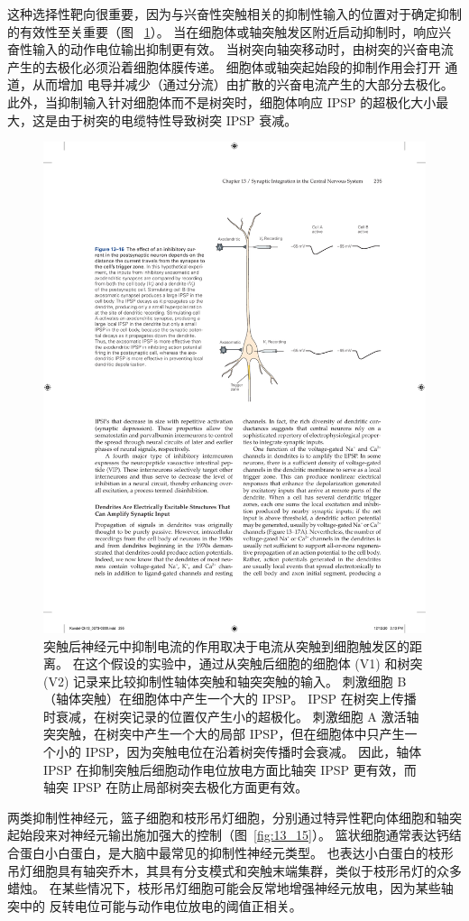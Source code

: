 这种选择性靶向很重要，因为与兴奋性突触相关的抑制性输入的位置对于确定抑制的有效性至关重要（图 ~\ref{fig:13_16}）。
当在细胞体或轴突触发区附近启动抑制时，响应兴奋性输入的动作电位输出抑制更有效。
当树突向轴突移动时，由树突的兴奋电流产生的去极化必须沿着细胞体膜传递。
细胞体或轴突起始段的抑制作用会打开  通道，从而增加  电导并减少（通过分流）由扩散的兴奋电流产生的大部分去极化。
此外，当抑制输入针对细胞体而不是树突时，细胞体响应 IPSP 的超极化大小最大，这是由于树突的电缆特性导致树突 IPSP 衰减。


\begin{figure}[htbp]
	\centering
	\includegraphics[width=0.6\linewidth]{chap13/fig_13_16}
	\caption{突触后神经元中抑制电流的作用取决于电流从突触到细胞触发区的距离。 在这个假设的实验中，通过从突触后细胞的细胞体 (V1) 和树突 (V2) 记录来比较抑制性轴体突触和轴突突触的输入。 刺激细胞 B（轴体突触）在细胞体中产生一个大的 IPSP。 IPSP 在树突上传播时衰减，在树突记录的位置仅产生小的超极化。 刺激细胞 A 激活轴突突触，在树突中产生一个大的局部 IPSP，但在细胞体中只产生一个小的 IPSP，因为突触电位在沿着树突传播时会衰减。 因此，轴体 IPSP 在抑制突触后细胞动作电位放电方面比轴突 IPSP 更有效，而轴突 IPSP 在防止局部树突去极化方面更有效。}
	\label{fig:13_16}
\end{figure}


两类抑制性神经元，篮子细胞和枝形吊灯细胞，分别通过特异性靶向体细胞和轴突起始段来对神经元输出施加强大的控制（图~\ref{fig:13_15}）。
篮状细胞通常表达钙结合蛋白小白蛋白，是大脑中最常见的抑制性神经元类型。
也表达小白蛋白的枝形吊灯细胞具有轴突乔木，其具有分支模式和突触末端集群，类似于枝形吊灯的众多蜡烛。
在某些情况下，枝形吊灯细胞可能会反常地增强神经元放电，因为某些轴突中的  反转电位可能与动作电位放电的阈值正相关。


